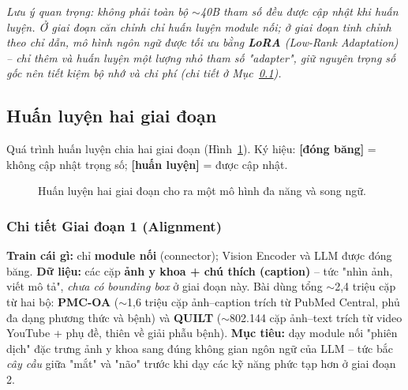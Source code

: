 \documentclass[12pt,a4paper,oneside]{extarticle}
\newcommand{\fact}[1]{#1}
\newcommand{\remark}[1]{\textit{#1}}
\newcommand{\important}[1]{\textbf{#1}}
\begin{document}
\remark{Lưu ý quan trọng: không phải toàn bộ $\sim$40B tham số đều được cập nhật khi huấn luyện.
Ở giai đoạn căn chỉnh chỉ huấn luyện module nối; ở giai đoạn tinh chỉnh theo chỉ dẫn, mô hình ngôn
ngữ được tối ưu bằng \textbf{LoRA} (Low-Rank Adaptation) -- chỉ thêm và huấn luyện một lượng nhỏ
tham số "adapter", giữ nguyên trọng số gốc nên tiết kiệm bộ nhớ và chi phí (chi tiết ở
Mục~\ref{ssec:training}).}

\subsection{Huấn luyện hai giai đoạn}
\label{ssec:training}
\fact{Quá trình huấn luyện chia hai giai đoạn (Hình~\ref{fig:training}). Ký hiệu: \textbf{[đóng
băng]} = không cập nhật trọng số; \textbf{[huấn luyện]} = được cập nhật.}

\begin{figure}[H]
\centering
{}
\caption{Huấn luyện hai giai đoạn cho ra một mô hình đa năng và song ngữ.}
\label{fig:training}
\end{figure}

\subsubsection*{Chi tiết Giai đoạn 1 (Alignment)}
\fact{\textbf{Train cái gì:} chỉ \important{module nối} (connector); Vision Encoder và LLM được
đóng băng. \textbf{Dữ liệu:} các cặp \important{ảnh y khoa + chú thích (caption)} -- tức "nhìn
ảnh, viết mô tả", \emph{chưa có bounding box} ở giai đoạn này. Bài dùng tổng $\sim$2,4 triệu cặp
từ hai bộ: \textbf{PMC-OA} ($\sim$1,6 triệu cặp ảnh--caption trích từ PubMed Central, phủ đa dạng
phương thức và bệnh) và \textbf{QUILT} ($\sim$802.144 cặp ảnh--text trích từ video YouTube + phụ
đề, thiên về giải phẫu bệnh). \textbf{Mục tiêu:} dạy module nối "phiên dịch" đặc trưng ảnh y khoa
sang đúng không gian ngôn ngữ của LLM -- tức bắc \emph{cây cầu} giữa "mắt" và "não" trước khi dạy
các kỹ năng phức tạp hơn ở giai đoạn 2.}
\end{document}
